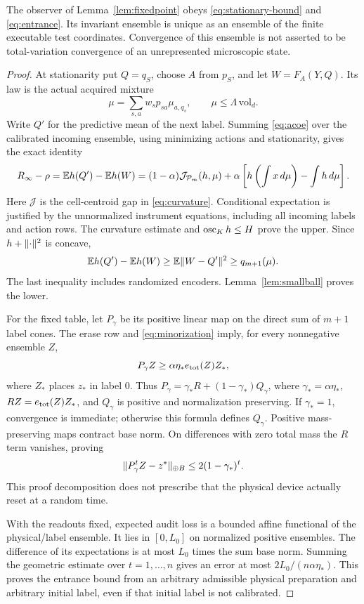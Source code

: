 \begin{proposition}\label{prop:invariant}
The observer of Lemma~\ref{lem:fixedpoint} obeys \eqref{eq:stationary-bound} and \eqref{eq:entrance}. Its invariant ensemble is unique as an ensemble of the finite executable test coordinates. Convergence of this ensemble is not asserted to be total-variation convergence of an unrepresented microscopic state.
\end{proposition}
\begin{proof}
At stationarity put $Q=q_S$, choose $A$ from $p_S$, and let $W=F_A(Y,Q)$. Its law is the actual acquired mixture
\[
 \mu=\sum_{s,a}w_sp_{sa}\mu_{a,q_s},\qquad \mu\le\Lambda\,\mathrm{vol}_d.
\]
Write $Q'$ for the predictive mean of the next label. Summing \eqref{eq:acoe} over the calibrated incoming ensemble, using minimizing actions and stationarity, gives the exact identity
\begin{equation}\label{eq:stationary-jensen}
 R_\infty-\rho=\mathbb E h(Q')-\mathbb E h(W)
 =(1-\alpha)\mathcal J_{\mathcal P_m}(h,\mu)
  +\alpha\left[h\left(\int x\,d\mu\right)-\int h\,d\mu\right].
\end{equation}
Here $\mathcal J$ is the cell-centroid gap in \eqref{eq:curvature}. Conditional expectation is justified by the unnormalized instrument equations, including all incoming labels and action rows. The curvature estimate and $\operatorname{osc}_Kh\le H$ prove the upper. Since $h+\lVert\cdot\rVert^2$ is concave,
\[
 \mathbb E h(Q')-\mathbb E h(W)\ge\mathbb E\lVert W-Q'\rVert^2\ge q_{m+1}(\mu).
\]
The last inequality includes randomized encoders. Lemma~\ref{lem:smallball} proves the lower.

For the fixed table, let $P_\gamma$ be its positive linear map on the direct sum of $m+1$ label cones. The erase row and \eqref{eq:minorization} imply, for every nonnegative ensemble $Z$,
\begin{equation}\label{eq:ensemble-minor}
 P_\gamma Z\ge\alpha\eta_* e_{\rm tot}(Z) Z_*,
\end{equation}
where $Z_*$ places $z_*$ in label $0$. Thus
$P_\gamma=\gamma_*R+(1-\gamma_*)Q_\gamma$,
where $\gamma_*=\alpha\eta_*$, $RZ=e_{\rm tot}(Z)Z_*$, and $Q_\gamma$ is positive and normalization preserving. If $\gamma_*=1$, convergence is immediate; otherwise this formula defines $Q_\gamma$. Positive mass-preserving maps contract base norm. On differences with zero total mass the $R$ term vanishes, proving
\[
 \lVert P_\gamma^t Z-z^*\rVert_{\oplus B}\le2(1-\gamma_*)^t.
\]
This proof decomposition does not prescribe that the physical device actually reset at a random time.

With the readouts fixed, expected audit loss is a bounded affine functional of the physical/label ensemble. It lies in $[0,L_0]$ on normalized positive ensembles. The difference of its expectations is at most $L_0$ times the sum base norm. Summing the geometric estimate over $t=1,\ldots,n$ gives an error at most $2L_0/(n\alpha\eta_*)$. This proves the entrance bound from an arbitrary admissible physical preparation and arbitrary initial label, even if that initial label is not calibrated.
\end{proof}

